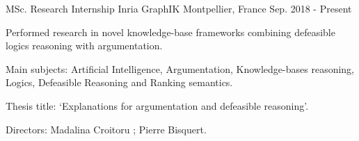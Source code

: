 

\begin{cventries}

  \cventry
    {MSc. Research Internship}
    {Inria GraphIK}
    {Montpellier, France}
    {Sep. 2018 - Present}
    {
      \begin{cvitems}
        \item Performed research in novel knowledge-base frameworks combining defeasible logics reasoning with argumentation.
        \item Main subjects: Artificial Intelligence, Argumentation, Knowledge-bases reasoning, Logics, Defeasible Reasoning and Ranking semantics. 
        \item Thesis title: `Explanations for argumentation and defeasible reasoning'.
        \item Directors: Madalina Croitoru ; Pierre Bisquert.
      \end{cvitems}
    }  

\end{cventries}
